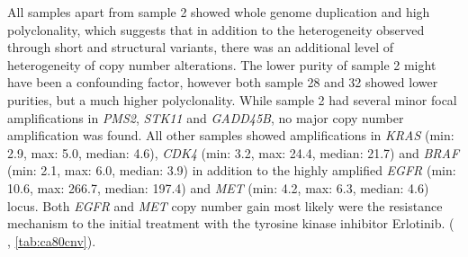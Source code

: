 All samples apart from sample 2 showed whole genome duplication and high polyclonality, which suggests that in addition to the heterogeneity observed through short and structural variants, there was an additional level of heterogeneity of copy number alterations. The lower purity of sample 2 might have been a confounding factor, however both sample 28 and 32 showed lower purities, but a much higher polyclonality. While sample 2 had several minor focal amplifications in \textit{PMS2}, \textit{STK11} and \textit{GADD45B}, no major copy number amplification was found. All other samples showed amplifications in \textit{KRAS} (min: 2.9, max: 5.0, median: 4.6), \textit{CDK4} (min: 3.2, max: 24.4, median: 21.7) and \textit{BRAF} (min: 2.1, max: 6.0, median: 3.9) in addition to the highly amplified \textit{EGFR} (min: 10.6, max: 266.7, median: 197.4) and \textit{MET} (min: 4.2, max: 6.3, median: 4.6) locus. Both \textit{EGFR} and \textit{MET} copy number gain most likely were the resistance mechanism to the initial treatment with the tyrosine kinase inhibitor Erlotinib. ( , \autoref{tab:ca80cnv}).


